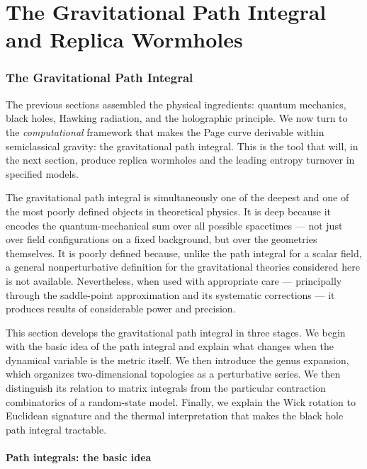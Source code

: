 \documentclass[11pt,letterpaper]{article}
\theoremstyle{plain}
\theoremstyle{definition}
\theoremstyle{remark}
\begin{document}
\part{The Gravitational Path Integral and Replica Wormholes}

\section{The Gravitational Path Integral}\label{sec05:path_integral}

The previous sections assembled the physical ingredients: quantum mechanics,
black holes, Hawking radiation, and the holographic principle.  We now turn to
the \emph{computational} framework that makes the Page curve derivable within
semiclassical gravity: the gravitational path integral.  This is the tool that
will, in the next section, produce replica wormholes and the leading
entropy turnover in specified models.

The gravitational path integral is simultaneously one of the deepest and one of
the most poorly defined objects in theoretical physics.  It is deep because it
encodes the quantum-mechanical sum over all possible spacetimes --- not just over
field configurations on a fixed background, but over the geometries themselves.
It is poorly defined because, unlike the path integral for a scalar field, a general nonperturbative definition for the gravitational theories
considered here is not available.  Nevertheless, when used with
appropriate care --- principally through the saddle-point approximation and its
systematic corrections --- it produces results of considerable power and precision.

This section develops the gravitational path integral in three stages.  We begin
with the basic idea of the path integral and explain what changes when the
dynamical variable is the metric itself.  We then introduce the genus expansion,
which organizes two-dimensional topologies as a perturbative series. We
then distinguish its relation to matrix integrals from the particular
contraction combinatorics of a random-state model.  Finally, we
explain the Wick rotation to Euclidean signature and the thermal interpretation
that makes the black hole path integral tractable.


\subsection{Path integrals: the basic idea}\label{subsec05:basic_idea}
\end{document}
